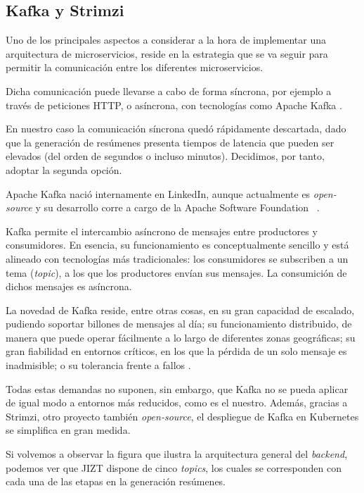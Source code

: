 \subsection{Kafka y Strimzi} \label{subsec:kafka}

Uno de los principales aspectos a considerar a la hora de implementar una arquitectura de microservicios, reside en la estrategia que se va seguir para permitir la comunicación entre los diferentes microservicios.

Dicha comunicación puede llevarse a cabo de forma síncrona, por ejemplo a través de peticiones HTTP, o asíncrona, con tecnologías como Apache Kafka \cite{microsoft-microsvcs}.

En nuestro caso la comunicación síncrona quedó rápidamente descartada, dado que la generación de resúmenes presenta tiempos de latencia que pueden ser elevados (del orden de segundos o incluso minutos). Decidimos, por tanto, adoptar la segunda opción.

Apache Kafka nació internamente en LinkedIn, aunque actualmente es \emph{open-source} y su desarrollo corre a cargo de la Apache Software Foundation ~\cite{wiki-kafka}.

Kafka permite el intercambio asíncrono de mensajes entre productores y consumidores. En esencia, su funcionamiento es conceptualmente sencillo y está alineado con tecnologías más tradicionales: los consumidores se subscriben a un tema (\emph{topic}), a los que los productores envían sus mensajes. La consumición de dichos mensajes es asíncrona.

La novedad de Kafka reside, entre otras cosas, en su gran capacidad de escalado, pudiendo soportar billones de mensajes al día; su funcionamiento distribuido, de manera que puede operar fácilmente a lo largo de diferentes zonas geográficas; su gran fiabilidad en entornos críticos, en los que la pérdida de un solo mensaje es inadmisible; o su tolerancia frente a fallos \cite{apache-kafka}.

Todas estas demandas no suponen, sin embargo, que Kafka no se pueda aplicar de igual modo a entornos más reducidos, como es el nuestro. Además, gracias a Strimzi, otro proyecto también \emph{open-source}, el despliegue de Kafka en Kubernetes se simplifica en gran medida.

Si volvemos a observar la figura que ilustra la arquitectura general del \emph{backend}, podemos ver que JIZT dispone de cinco \emph{topics}, los cuales se corresponden con cada una de las etapas en la generación resúmenes.

